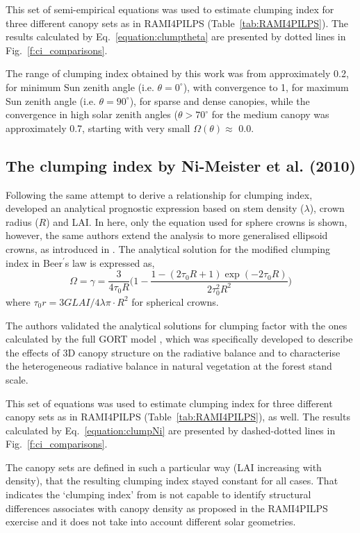 \documentclass[a4paper,11pt]{report}
\begin{document}
This set of semi-empirical equations was used to estimate clumping index for three different canopy sets as in RAMI4PILPS (Table~\ref{tab:RAMI4PILPS}). The results calculated by Eq.~\ref{equation:clumptheta} are presented by dotted lines in Fig.~\ref{f:ci_comparisons}.

The range of clumping index obtained by this work was from approximately 0.2, for minimum Sun zenith angle (i.e. $\theta = 0^{\circ}$), with convergence to 1, for maximum Sun zenith angle (i.e. $\theta = 90^{\circ}$), for sparse and dense canopies, while the convergence in high solar zenith angles ($\theta > 70^{\circ}$ for the medium canopy was approximately 0.7, starting with very small $\Omega(\theta) \approx$ 0.0.

\subsection{The clumping index by Ni-Meister et al. (2010)}
Following the same attempt to derive a relationship for clumping index, \citet{Ni-Meister2010} developed an analytical prognostic expression based on stem density ($\lambda$), crown radius ($R$) and LAI. In here, only the equation used for sphere crowns is shown, however, the same authors extend the analysis to more generalised ellipsoid crowns, as introduced in \citet{Li1988}. The analytical solution for the modified clumping index in Beer$^{\prime}$s law is expressed as, 
\begin{equation}
\Omega = \gamma = \frac{3}{4\tau_0R}\Big(1 - \frac{1 - (2\tau_0R + 1)\exp(-2\tau_0R)}{2\tau_0^2R^2}\Big)
\label{equation:clumpNi}
\end{equation}
\noindent where $\tau_0r = 3 G LAI/ 4 \lambda \pi \cdot R^2$ for spherical crowns. 

The authors validated the analytical solutions for clumping factor with the ones calculated by the full GORT model \citep{Li1995}, which was specifically developed to describe the effects of 3D canopy structure on the radiative balance and to characterise the heterogeneous radiative balance in natural vegetation at the forest stand scale. 

This set of equations was used to estimate clumping index for three different canopy sets as in RAMI4PILPS (Table~\ref{tab:RAMI4PILPS}), as well. The results calculated by Eq.~\ref{equation:clumpNi} are presented by dashed-dotted lines in Fig.~\ref{f:ci_comparisons}. 

The canopy sets are defined in such a particular way (LAI increasing with density), that the resulting clumping index stayed constant for all cases. That indicates the `clumping index' from \citet{Ni-Meister2010} is not capable to identify structural differences associates with canopy density as proposed in the RAMI4PILPS exercise and it does not take into account different solar geometries.
\end{document}
